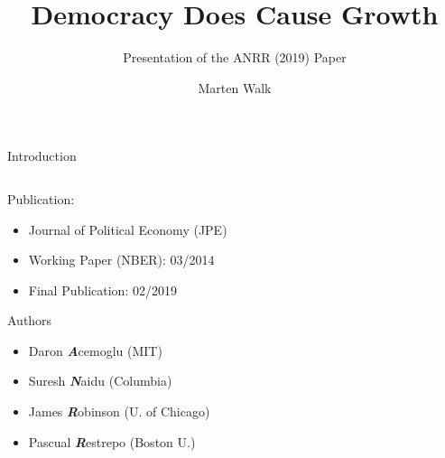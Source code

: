 \documentclass[
  ignorenonframetext,
]{beamer}
\title{Democracy Does Cause Growth}
\subtitle{Presentation of the ANRR (2019) Paper}
\author{Marten Walk}
\date{}
\institute{Empirical Economics}
\providecommand{\tightlist}{%
  \setlength{\itemsep}{0pt}\setlength{\parskip}{0pt}}\usepackage{longtable,booktabs,array}
\begin{document}
\frame{\titlepage}
\ifdefined\Shaded\renewenvironment{Shaded}{\begin{tcolorbox}[interior hidden, boxrule=0pt, borderline west={3pt}{0pt}{shadecolor}, sharp corners, breakable, enhanced, frame hidden]}{\end{tcolorbox}}\fi

\begin{frame}{Introduction}
\protect\hypertarget{introduction}{}
\begin{columns}[T]
\begin{column}{0.6\textwidth}
\hfill\break

Publication:

\begin{itemize}
\tightlist
\item
  Journal of Political Economy (JPE)
\item
  Working Paper (NBER): 03/2014
\item
  Final Publication: 02/2019
\end{itemize}

\hfill\break

Authors

\begin{itemize}
\tightlist
\item
  Daron \textbf{\emph{A}}cemoglu (MIT)
\item
  Suresh \textbf{\emph{N}}aidu (Columbia)
\item
  James \textbf{\emph{R}}obinson (U. of Chicago)
\item
  Pascual \textbf{\emph{R}}estrepo (Boston U.)
\end{itemize}
\end{column}

\begin{column}{0.4\textwidth}
\begin{figure}


\end{figure}
\end{column}
\end{columns}
\end{frame}
\end{document}
